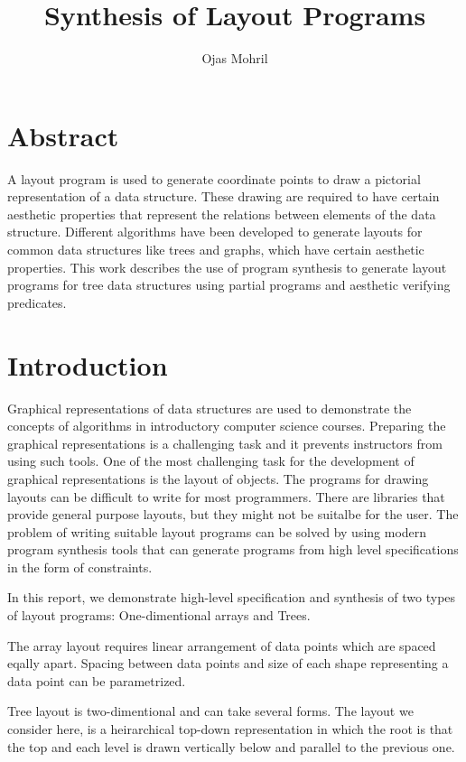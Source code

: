 \documentclass{article}
\title{Synthesis of Layout Programs}
\author{Ojas Mohril}
\begin{document}
\maketitle

\section{Abstract}

A layout program is used to generate coordinate points to draw a
pictorial representation of a data structure.  These drawing are
required to have certain aesthetic properties that represent the
relations between elements of the data structure.  Different
algorithms have been developed to generate layouts for common data
structures like trees and graphs, which have certain aesthetic
properties.  This work describes the use of program synthesis to
generate layout programs for tree data structures using partial
programs and aesthetic verifying predicates.

\section{Introduction}

Graphical representations of data structures are used to demonstrate
the concepts of algorithms in introductory computer science courses.
Preparing the graphical representations is a challenging task and it
prevents instructors from using such tools.  One of the most
challenging task for the development of graphical representations is
the layout of objects.  The programs for drawing layouts can be
difficult to write for most programmers.  There are libraries that
provide general purpose layouts, but they might not be suitalbe for
the user.  The problem of writing suitable layout programs can be
solved by using modern program synthesis tools that can generate
programs from high level specifications in the form of constraints.

In this report, we demonstrate high-level specification and synthesis
of two types of layout programs: One-dimentional arrays and Trees.

The array layout requires linear arrangement of data points which are
spaced eqally apart.  Spacing between data points and size of each
shape representing a data point can be parametrized.

Tree layout is two-dimentional and can take several forms.  The layout
we consider here, is a heirarchical top-down representation in which
the root is that the top and each level is drawn vertically below and
parallel to the previous one.
\end{document}
